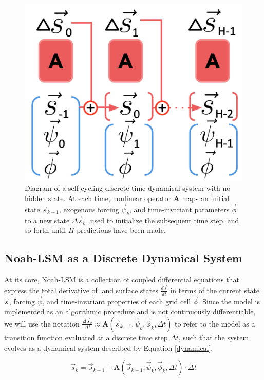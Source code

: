 \begin{figure}[h]
    \centering

    \includegraphics[width=.66\linewidth]{figures/schematic_scann.png}

    \caption{Diagram of a self-cycling discrete-time dynamical system with no hidden state. At each time, nonlinear operator \textbf{A} maps an initial state $\vec{s}_{k-1}$, exogenous forcing $\vec{\psi}_k$, and time-invariant parameters $\vec{\phi}$ to a new state $\Delta \vec{s}_k$, used to initialize the subsequent time step, and so forth until $H$ predictions have been made.}
    \label{scann}
\end{figure}

\subsection{Noah-LSM as a Discrete Dynamical System}

At its core, Noah-LSM is a collection of coupled differential equations that express the total derivative of land surface states $\frac{d\vec{s}}{dt}$ in terms of the current state $\vec{s}$, forcing $\vec{\psi}$, and time-invariant properties of each grid cell $\vec{\phi}$. Since the model is implemented as an algorithmic procedure and is not continuously differentiable, we will use the notation $\frac{\Delta \vec{s}_k}{\Delta t} \approx \mathbf{A}(\vec{s}_{k-1}, \vec{\psi}_k, \vec{\phi}_k, \Delta t)$ to refer to the model as a transition function evaluated at a discrete time step $\Delta t$, such that the system evolves as a dynamical system described by Equation \ref{dynamical}.

\begin{equation}\label{dynamical}
    \vec{s}_k = \vec{s}_{k-1} + \mathbf{A}(\vec{s}_{k-1}, \vec{\psi}_k, \vec{\phi}_k, \Delta t) \cdot \Delta t
\end{equation}

